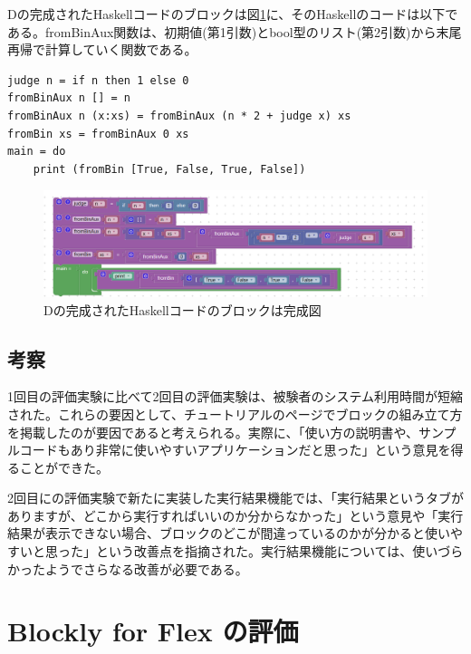 \documentclass{risepaper}
\begin{document}
\begin{itemize}
Dの完成されたHaskellコードのブロックは図\ref{fig:haskell_experiment_result_d}に、そのHaskellのコードは以下である。fromBinAux関数は、初期値(第1引数)とbool型のリスト(第2引数)から末尾再帰で計算していく関数である。

\begin{lstlisting}[basicstyle=\ttfamily\footnotesize]
judge n = if n then 1 else 0
fromBinAux n [] = n
fromBinAux n (x:xs) = fromBinAux (n * 2 + judge x) xs
fromBin xs = fromBinAux 0 xs
main = do
    print (fromBin [True, False, True, False])
\end{lstlisting}

\begin{figure}[h]
\begin{center}
\includegraphics[scale=0.5]{img/haskell_experiment_result_d.PNG}
\caption{Dの完成されたHaskellコードのブロックは完成図}%
\label{fig:haskell_experiment_result_d}
\end{center}%
\end{figure}%

\end{itemize} 

		\subsection{考察}
        
1回目の評価実験に比べて2回目の評価実験は、被験者のシステム利用時間が短縮された。これらの要因として、チュートリアルのページでブロックの組み立て方を掲載したのが要因であると考えられる。実際に、「使い方の説明書や、サンプルコードもあり非常に使いやすいアプリケーションだと思った」という意見を得ることができた。

2回目にの評価実験で新たに実装した実行結果機能では、「実行結果というタブがありますが、どこから実行すればいいのか分からなかった」という意見や「実行結果が表示できない場合、ブロックのどこが間違っているのかが分かると使いやすいと思った」という改善点を指摘された。実行結果機能については、使いづらかったようでさらなる改善が必要である。

   \section{Blockly for Flex の評価}
   
\end{document}
